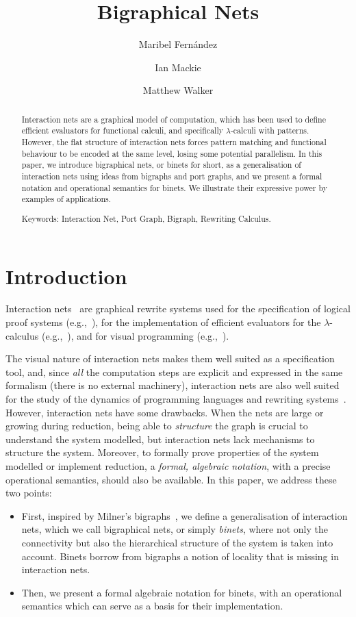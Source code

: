 \documentclass[copyright,creativecommons]{eptcs}
\title{Bigraphical Nets}
\author{Maribel Fern\'andez
\and Ian Mackie 
\and Matthew Walker
\institute{\'Ecole Normale Sup\'erieure,  Paris, France\\
\'Ecole Polytechnique,  Palaiseau, France\\
King's College London, Dept.\ of Informatics,  London WC2R 2LS, UK}
}
\begin{document}
\maketitle


\begin{abstract} 
Interaction nets are a graphical model of computation, which has been
used to define efficient evaluators for functional calculi, and
specifically $\lambda$-calculi with patterns.  However, the flat
structure of interaction nets forces pattern matching and functional
behaviour to be encoded at the same level, losing some potential
parallelism.  In this paper, we introduce bigraphical nets, or
binets for short, as a generalisation
of interaction nets using ideas from bigraphs and port graphs, and we
present a formal notation and operational semantics for binets.  We
illustrate their expressive power by examples of applications.

Keywords: Interaction Net, Port Graph, Bigraph, Rewriting Calculus.
\end{abstract}

\section{Introduction}

Interaction nets~\cite{LafontY:intn} are graphical rewrite systems
used for the specification of logical proof systems
(e.g.,~\cite{AlvesS:gracp,LafontY:fropni}), for the implementation of
efficient evaluators for the $\lambda$-calculus
(e.g.,~\cite{GonthierG:geoolr,AspertiA:bolhom,MackieIC:efflei}), and
for visual programming
(e.g.,~\cite{MackieIC:diagrams,MackieIC:tamc,MackieIC:vcc}).

The visual nature of interaction nets makes them well suited as a
specification tool, and, since \emph{all} the computation steps are
explicit and expressed in the same formalism (there is no external
machinery), interaction nets are also well suited for the study of the
dynamics of programming languages and rewriting
systems~\cite{MackieIC:intntr,FernandezM:inMCpa,PintoJS:seqcam}. 
However, interaction nets have some drawbacks. 
When the nets are large or growing during reduction, being able to
\emph{structure} the graph is crucial to understand the system
modelled, but interaction nets lack mechanisms to structure the system.
Moreover, to formally prove properties of the system modelled or
implement reduction, a \emph{formal, algebraic notation}, with a
precise operational semantics, should also be available. In this
paper, we address these two points:
\begin{itemize}
\item
 First, inspired by Milner's bigraphs~\cite{Milner}, we define a
 generalisation of interaction nets, which we call bigraphical nets,
 or simply \emph{binets}, where not only the connectivity but also
 the hierarchical structure of the system is taken into
 account. Binets borrow from bigraphs a notion of locality that is
 missing in interaction nets.
\item
Then,  we present a
formal algebraic notation for binets, with an operational semantics
which can serve as a basis for their implementation.
\end{itemize}
\end{document}
